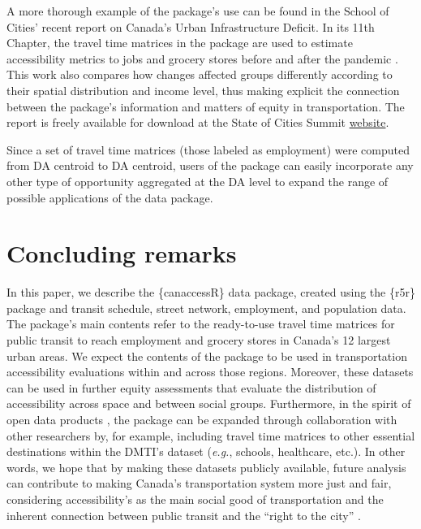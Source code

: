 \documentclass[Royal,times,sageh]{sagej}
\begin{document}
A more thorough example of the package's use can be found in the School
of Cities' recent report on Canada's Urban Infrastructure Deficit. In
its 11th Chapter, the travel time matrices in the package are used to
estimate accessibility metrics to jobs and grocery stores before and
after the pandemic \citep{pargaDemocraticAccessOur2024}. This work also
compares how changes affected groups differently according to their
spatial distribution and income level, thus making explicit the
connection between the package's information and matters of equity in
transportation. The report is freely available for download at the State
of Cities Summit \href{https://stateofcitiessummit.ca/report}{website}.

Since a set of travel time matrices (those labeled as employment) were
computed from DA centroid to DA centroid, users of the package can
easily incorporate any other type of opportunity aggregated at the DA
level to expand the range of possible applications of the data package.

\section{Concluding remarks}\label{concluding-remarks}

In this paper, we describe the \{canaccessR\} data package, created
using the \{r5r\} package and transit schedule, street network,
employment, and population data. The package's main contents refer to
the ready-to-use travel time matrices for public transit to reach
employment and grocery stores in Canada's 12 largest urban areas. We
expect the contents of the package to be used in transportation
accessibility evaluations within and across those regions. Moreover,
these datasets can be used in further equity assessments that evaluate
the distribution of accessibility across space and between social
groups. Furthermore, in the spirit of open data products
\citep{arribas-belOpenDataProductsA2021}, the package can be expanded
through collaboration with other researchers by, for example, including
travel time matrices to other essential destinations within the DMTI's
dataset (\emph{e.g.}, schools, healthcare, etc.). In other words, we
hope that by making these datasets publicly available, future analysis
can contribute to making Canada's transportation system more just and
fair, considering accessibility's as the main social good of
transportation \citep{martensTransportJusticeDesigning2016} and the
inherent connection between public transit and the ``right to the city''
\citep{cogginRightTransportMoving2015}.
\end{document}
